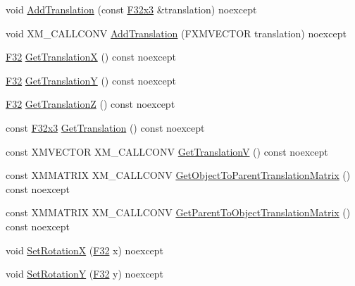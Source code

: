 \begin{DoxyCompactItemize}
\item 
void \mbox{\hyperlink{classmage_1_1_local_transform_ae859ff5d5f4bc7d106b8c4cf233c8f8a}{Add\+Translation}} (const \mbox{\hyperlink{namespacemage_a1e3c7a882af461f161caa1cbddaf1fa2}{F32x3}} \&translation) noexcept
\item 
void X\+M\+\_\+\+C\+A\+L\+L\+C\+O\+NV \mbox{\hyperlink{classmage_1_1_local_transform_a43e89031fcab7af7e7fb1c7d80e06438}{Add\+Translation}} (F\+X\+M\+V\+E\+C\+T\+OR translation) noexcept
\item 
\mbox{\hyperlink{namespacemage_aa97e833b45f06d60a0a9c4fc22ae02c0}{F32}} \mbox{\hyperlink{classmage_1_1_local_transform_ae021c17cf996088044a9c4f7be1601b8}{Get\+TranslationX}} () const noexcept
\item 
\mbox{\hyperlink{namespacemage_aa97e833b45f06d60a0a9c4fc22ae02c0}{F32}} \mbox{\hyperlink{classmage_1_1_local_transform_a31441b5c6cca77b6f0e8c5cc9c3bf3f0}{Get\+TranslationY}} () const noexcept
\item 
\mbox{\hyperlink{namespacemage_aa97e833b45f06d60a0a9c4fc22ae02c0}{F32}} \mbox{\hyperlink{classmage_1_1_local_transform_a09d94a592dab22c23e664402144d75bc}{Get\+TranslationZ}} () const noexcept
\item 
const \mbox{\hyperlink{namespacemage_a1e3c7a882af461f161caa1cbddaf1fa2}{F32x3}} \mbox{\hyperlink{classmage_1_1_local_transform_a302713192aca919d01e02fb4eac2d2c5}{Get\+Translation}} () const noexcept
\item 
const X\+M\+V\+E\+C\+T\+OR X\+M\+\_\+\+C\+A\+L\+L\+C\+O\+NV \mbox{\hyperlink{classmage_1_1_local_transform_a18dc6111bfca7d24f3f24e2c1dff8d0b}{Get\+TranslationV}} () const noexcept
\item 
const X\+M\+M\+A\+T\+R\+IX X\+M\+\_\+\+C\+A\+L\+L\+C\+O\+NV \mbox{\hyperlink{classmage_1_1_local_transform_a417c97411f3214119a1e7298de4b1631}{Get\+Object\+To\+Parent\+Translation\+Matrix}} () const noexcept
\item 
const X\+M\+M\+A\+T\+R\+IX X\+M\+\_\+\+C\+A\+L\+L\+C\+O\+NV \mbox{\hyperlink{classmage_1_1_local_transform_aa64c46933f029f5952895a185b5fdd29}{Get\+Parent\+To\+Object\+Translation\+Matrix}} () const noexcept
\item 
void \mbox{\hyperlink{classmage_1_1_local_transform_a57f9839911c987f3cfc5b686a80c6624}{Set\+RotationX}} (\mbox{\hyperlink{namespacemage_aa97e833b45f06d60a0a9c4fc22ae02c0}{F32}} x) noexcept
\item 
void \mbox{\hyperlink{classmage_1_1_local_transform_a6fe237d9f56681271273f47b26b89ac0}{Set\+RotationY}} (\mbox{\hyperlink{namespacemage_aa97e833b45f06d60a0a9c4fc22ae02c0}{F32}} y) noexcept

\end{DoxyCompactItemize}
